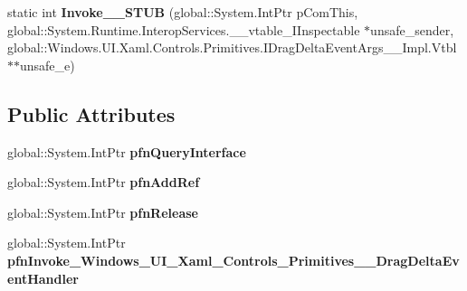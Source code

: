 \begin{DoxyCompactItemize}
\item 
\mbox{\label{struct_windows_1_1_u_i_1_1_xaml_1_1_controls_1_1_primitives_1_1_drag_delta_event_handler_____impl_1_1_vtbl_a76c8d2fb3c89d7ee2fce021774b302e4}} 
static int {\bfseries Invoke\+\_\+\+\_\+\+S\+T\+UB} (global\+::\+System.\+Int\+Ptr p\+Com\+This, global\+::\+System.\+Runtime.\+Interop\+Services.\+\_\+\+\_\+vtable\+\_\+\+I\+Inspectable $\ast$unsafe\+\_\+sender, global\+::\+Windows.\+U\+I.\+Xaml.\+Controls.\+Primitives.\+I\+Drag\+Delta\+Event\+Args\+\_\+\+\_\+\+Impl.\+Vtbl $\ast$$\ast$unsafe\+\_\+e)
\end{DoxyCompactItemize}
\subsection*{Public Attributes}
\begin{DoxyCompactItemize}
\item 
\mbox{\label{struct_windows_1_1_u_i_1_1_xaml_1_1_controls_1_1_primitives_1_1_drag_delta_event_handler_____impl_1_1_vtbl_a636523ec16c0903c59d35d9834de232b}} 
global\+::\+System.\+Int\+Ptr {\bfseries pfn\+Query\+Interface}
\item 
\mbox{\label{struct_windows_1_1_u_i_1_1_xaml_1_1_controls_1_1_primitives_1_1_drag_delta_event_handler_____impl_1_1_vtbl_aa40aeacdb6caf83f183f8bcc590f8e09}} 
global\+::\+System.\+Int\+Ptr {\bfseries pfn\+Add\+Ref}
\item 
\mbox{\label{struct_windows_1_1_u_i_1_1_xaml_1_1_controls_1_1_primitives_1_1_drag_delta_event_handler_____impl_1_1_vtbl_ae2eae7a85945a567c78b549ca7432f83}} 
global\+::\+System.\+Int\+Ptr {\bfseries pfn\+Release}
\item 
\mbox{\label{struct_windows_1_1_u_i_1_1_xaml_1_1_controls_1_1_primitives_1_1_drag_delta_event_handler_____impl_1_1_vtbl_a9dd01e1b16074d6fbc97a38b010afd24}} 
global\+::\+System.\+Int\+Ptr {\bfseries pfn\+Invoke\+\_\+\+Windows\+\_\+\+U\+I\+\_\+\+Xaml\+\_\+\+Controls\+\_\+\+Primitives\+\_\+\+\_\+\+Drag\+Delta\+Event\+Handler}
\end{DoxyCompactItemize}
